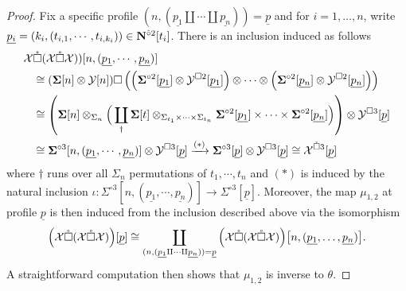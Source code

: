 \begin{proof}
    Fix a specific profile $(n,(\underline{p_1}\amalg \cdots \amalg \underline{p_n}))=\underline{p}$ and for $i=1,\dots,n$, write $\underline{p_i}=(k_i, (t_{i,1},\cdots, t_{i,k_i})) \in \mathbf{N}^{\hat{\circ}2}[t_i]$. There is an inclusion induced as follows \begin{align} 
         \mathcal{X} &\mathring{\square} (\mathcal{X} \mathring{\square} \mathcal{X}) ) [n, (\underline{p_1},\cdots,\underline{p_n})] 
         \\
        & \cong (\mathbf{\Sigma}[n] \otimes  \mathcal{Y}[n]) \square \left( \left( \mathbf{\Sigma}^{\circ 2}[\underline{p_1}] \otimes \mathcal{Y}^{\square 2}[\underline{p_1}]\right)  \otimes \cdots \otimes \left( \mathbf{\Sigma}^{\circ 2}[\underline{p_n}] \otimes \mathcal{Y}^{\square 2}[\underline{p_n}]\right) \right) \nonumber
        \\
        & \cong \left(\mathbf{\Sigma}[n] \otimes_{\Sigma_n} \Big(\coprod_{\dagger}\mathbf{\Sigma}[t] \otimes_{\Sigma_{t_1} \times \cdots \times \Sigma_{t_n}} \mathbf{\Sigma}^{\circ 2}[\underline{p_1}] \times \cdots \times \mathbf{\Sigma}^{\circ 2}[\underline{p_n}] \Big) \right) \otimes \mathcal{Y}^{\square 3}[\underline{p}] \nonumber 
        \\ 
        & \cong \mathbf{\Sigma}^{\circ 3} [n, (\underline{p_1},\cdots, \underline{p_n})] \otimes \mathcal{Y}^{\square 3}[\underline{p}] \xrightarrow{(*)} \mathbf{\Sigma}^{\circ 3}[\underline{p}] \otimes \mathcal{Y}^{\square 3}[\underline{p}]  \cong \mathcal{X}^{\mathring{\square} 3} [\underline{p}] \nonumber
    \end{align}
    where $\dagger$ runs over all $\Sigma_n$ permutations of $t_1,\cdots,t_n$ and $(*)$ is induced by the natural inclusion $\iota\colon \Sigma^{\circ 3} [n, (\underline{p_1},\cdots, \underline{p_n})] \to \Sigma^{\circ 3} [\underline{p}]$. Moreover, the map $\mu_{1,2}$ at profile $\underline{p}$ is then induced from the inclusion described above via the isomorphism\[
        \Big(\mathcal{X}\mathring{\square} (\mathcal{X} \mathring{\square} \mathcal{X}) \Big)[\underline{p}] \cong \coprod_{(n,(\underline{p_1}\amalg \cdots \amalg \underline{p_n}))=\underline{p}} \Big(\mathcal{X}\mathring{\square} (\mathcal{X} \mathring{\square} \mathcal{X}) \Big)\big [n,(\underline{p_1},\dots,\underline{p_n})\big].
    \]
    A straightforward computation then shows that $\mu_{1,2}$ is inverse to $\theta$.
    

\end{proof}
